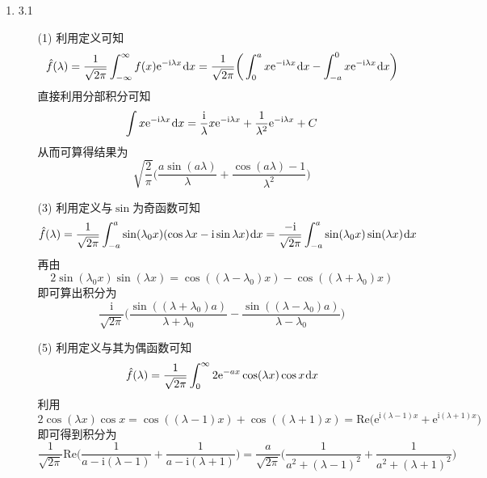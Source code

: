 \documentclass[a4paper,UTF8,fontset=windows,10pt]{ctexart}
\newcommand*{\dr}{\hspace{0.07em}\mathrm{d}}
\newcommand*{\er}{\mathrm{e}}
\newcommand*{\ir}{\mathrm{i}}
\begin{document}
\begin{enumerate}
    \item 3.1
    \begin{enumerate}
        \item[(1)] 利用定义可知
        $$\hat{f}(\lambda)=\frac{1}{\sqrt{2\pi}}\int_{-\infty}^\infty f(x)\er^{-\ir\lambda x}\dr x=\frac{1}{\sqrt{2\pi}}\bigg(\int_0^ax\er^{-\ir\lambda x}\dr x-\int_{-a}^0x\er^{-\ir\lambda x}\dr x\bigg)$$
        直接利用分部积分可知
        $$\int x\er^{-\ir\lambda x}\dr x=\frac{\ir}{\lambda}x\er^{-\ir\lambda x}+\frac{1}{\lambda^2}\er^{-\ir\lambda x}+C$$
        从而可算得结果为
        $$\sqrt{\frac{2}{\pi}}\bigg(\frac{a\sin(a\lambda)}{\lambda}+\frac{\cos(a\lambda)-1}{\lambda^2}\bigg)$$
        \item[(3)] 利用定义与$\sin$为奇函数可知
        $$\hat{f}(\lambda)=\frac{1}{\sqrt{2\pi}}\int_{-a}^a\sin(\lambda_0x)(\cos\lambda x-\ir\sin\lambda x)\dr x=\frac{-\ir}{\sqrt{2\pi}}\int_{-a}^a\sin(\lambda_0x)\sin(\lambda x)\dr x$$
        再由
        $$2\sin(\lambda_0x)\sin(\lambda x)=\cos((\lambda-\lambda_0)x)-\cos((\lambda+\lambda_0)x)$$
        即可算出积分为
        $$\frac{\ir}{\sqrt{2\pi}}\bigg(\frac{\sin((\lambda+\lambda_0)a)}{\lambda+\lambda_0}-\frac{\sin((\lambda-\lambda_0)a)}{\lambda-\lambda_0}\bigg)$$
        \item[(5)] 利用定义与其为偶函数可知
        $$\hat{f}(\lambda)=\frac{1}{\sqrt{2\pi}}\int_0^\infty 2\er^{-ax}\cos(\lambda x)\cos x\dr x$$
        利用
        $$2\cos(\lambda x)\cos x=\cos((\lambda-1)x)+\cos((\lambda+1)x)=\mathrm{Re}\big(\er^{\ir(\lambda-1)x}+\er^{\ir(\lambda+1)x}\big)$$
        即可得到积分为
        $$\frac{1}{\sqrt{2\pi}}\mathrm{Re}\bigg(\frac{1}{a-\ir(\lambda-1)}+\frac{1}{a-\ir(\lambda+1)}\bigg)=\frac{a}{\sqrt{2\pi}}\bigg(\frac{1}{a^2+(\lambda-1)^2}+\frac{1}{a^2+(\lambda+1)^2}\bigg)$$
    \end{enumerate}
\end{enumerate}
\end{document}
